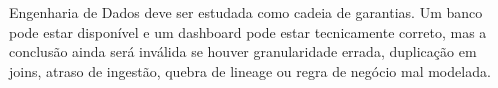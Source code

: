 \begin{resumo}
Engenharia de Dados deve ser estudada como cadeia de garantias. Um banco pode estar disponível e um dashboard pode estar tecnicamente correto, mas a conclusão ainda será inválida se houver granularidade errada, duplicação em joins, atraso de ingestão, quebra de lineage ou regra de negócio mal modelada.
\end{resumo}
